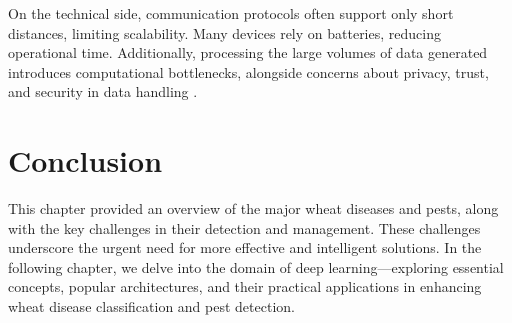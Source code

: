 On the technical side, communication protocols often support only short distances, limiting scalability. Many devices rely on batteries, reducing operational time. Additionally, processing the large volumes of data generated introduces computational bottlenecks, alongside concerns about privacy, trust, and security in data handling \parencite{idoje2021survey}.



\section{Conclusion}

This chapter provided an overview of the major wheat diseases and pests, along with the key challenges in their detection and management. These challenges underscore the urgent need for more effective and intelligent solutions. In the following chapter, we delve into the domain of deep learning—exploring essential concepts, popular architectures, and their practical applications in enhancing wheat disease classification and pest detection.



